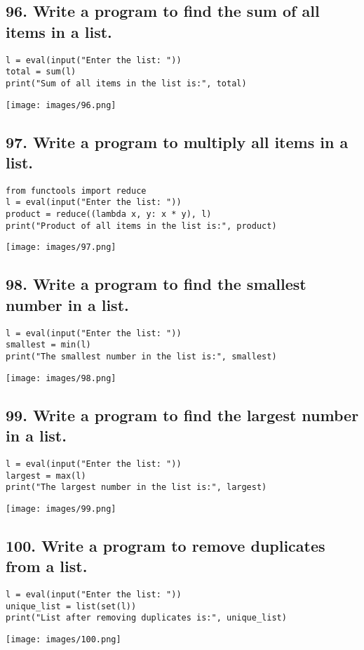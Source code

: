 \documentclass[12pt]{article}
\begin{document}
\subsection*{96. Write a program to find the sum of all items in a list.}
\begin{verbatim}
l = eval(input("Enter the list: "))
total = sum(l)
print("Sum of all items in the list is:", total)
\end{verbatim}
\texttt{[image: images/96.png]}

\subsection*{97. Write a program to multiply all items in a list.}
\begin{verbatim}
from functools import reduce
l = eval(input("Enter the list: "))
product = reduce((lambda x, y: x * y), l)
print("Product of all items in the list is:", product)
\end{verbatim}
\texttt{[image: images/97.png]}

\subsection*{98. Write a program to find the smallest number in a list.}
\begin{verbatim}
l = eval(input("Enter the list: "))
smallest = min(l)
print("The smallest number in the list is:", smallest)
\end{verbatim}
\texttt{[image: images/98.png]}

\subsection*{99. Write a program to find the largest number in a list.}
\begin{verbatim}
l = eval(input("Enter the list: "))
largest = max(l)
print("The largest number in the list is:", largest)
\end{verbatim}
\texttt{[image: images/99.png]}

\subsection*{100. Write a program to remove duplicates from a list.}
\begin{verbatim}
l = eval(input("Enter the list: "))
unique_list = list(set(l))
print("List after removing duplicates is:", unique_list)
\end{verbatim}
\texttt{[image: images/100.png]}
\end{document}
